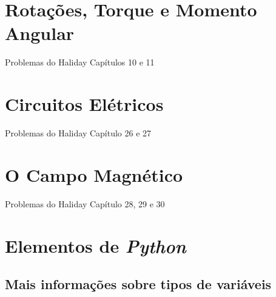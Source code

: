 \documentclass[12pt,a4paper,titlepage,portuges,twoside,final]{book}
\begin{document}

	
	\newpage
	\frontmatter

	
	\baselineskip 0.7cm  \tableofcontents
	\newpage
	\renewcommand\lstlistlistingname{Lista de Códigos Computacionais}
	\lstlistoflistings
	
\mainmatter	
\pagestyle{headings}
\setcounter{page}{1}














\chapter{Rotações, Torque e Momento Angular}
Problemas do Haliday Capítulos 10 e 11















\chapter{Circuitos Elétricos}
Problemas do Haliday Capítulo 26 e 27

\chapter{O Campo Magnético}
Problemas do Haliday Capítulo 28, 29 e 30







\appendix
\chapter{Elementos de {\it Python}}\label{a:numpy}
\section{Mais informações sobre tipos de variáveis}\label{ap:1.1}
\end{document}

